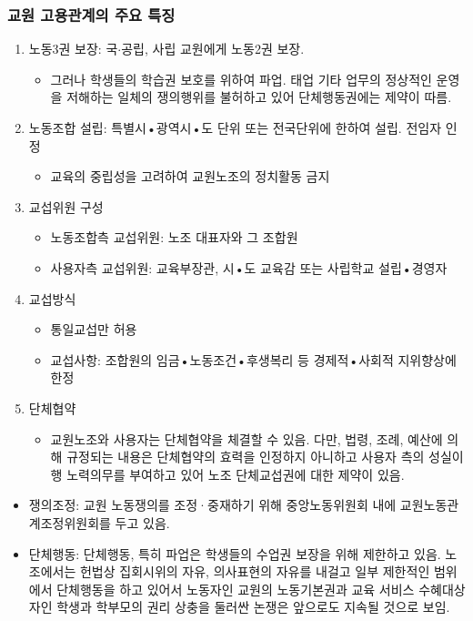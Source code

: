 \documentclass[aspectratio=169,xcolor=dvipsnames,handout]{beamer}
\begin{document}
\begin{frame}[allowframebreaks]
    \frametitle{교원 고용관계의 주요 특징}
    \begin{enumerate}[<+->]
        \item 노동3권 보장: 국$\cdot$공립, 사립 교원에게 노동2권 보장.
        \begin{itemize}
            \item  그러나 학생들의 학습권 보호를 위하여 파업. 태업 기타 업무의 정상적인 운영을 저해하는 일체의 쟁의행위를 불허하고 있어 단체행동권에는 제약이 따름.
        \end{itemize}
        \item 노동조합 설립: 특별시•광역시•도 단위 또는 전국단위에 한하여 설립. 전임자 인정
        \begin{itemize}
            \item 교육의 중립성을 고려하여 교원노조의 정치활동 금지
        \end{itemize}
    \framebreak%
        \item 교섭위원 구성
        \begin{itemize}
            \item 노동조합측 교섭위원: 노조 대표자와 그 조합원 
            \item 사용자측 교섭위원: 교육부장관, 시•도 교육감 또는 사립학교 설립•경영자
        \end{itemize}
        \item 교섭방식
        \begin{itemize}
            \item 통일교섭만 허용
            \item 교섭사항: 조합원의 임금•노동조건•후생복리 등 경제적•사회적 지위향상에 한정
        \end{itemize}
        \item 단체협약
        \begin{itemize}
            \item 교원노조와 사용자는 단체협약을 체결할 수 있음. 다만, 법령, 조례, 예산에 의해 규정되는 내용은 단체협약의 효력을 인정하지 아니하고 사용자 측의 성실이행 노력의무를 부여하고 있어 노조 단체교섭권에 대한 제약이 있음.
        \end{itemize}
    \end{enumerate}
    \begin{itemize}[<+->]
        \item 쟁의조정: 교원 노동쟁의를 조정·중재하기 위해 중앙노동위원회 내에 교원노동관계조정위원회를 두고 있음.
        \item 단체행동:  단체행동, 특히 파업은 학생들의 수업권 보장을 위해 제한하고 있음. 노조에서는 헌법상 집회시위의 자유, 의사표현의 자유를 내걸고 일부 제한적인 범위에서 단체행동을 하고 있어서 노동자인 교원의 노동기본권과 교육 서비스 수혜대상자인 학생과 학부모의 권리 상충을 둘러싼 논쟁은 앞으로도 지속될 것으로 보임. 
    \end{itemize}
\end{frame}
\end{document}
